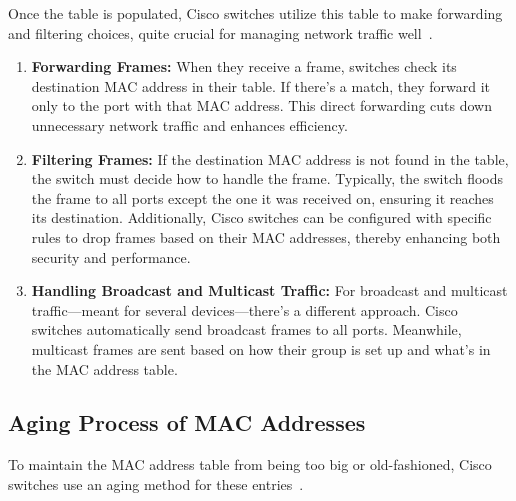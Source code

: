 \documentclass[11pt,a4paper]{article}
\begin{document}
Once the table is populated, Cisco switches utilize this table to make forwarding and filtering choices, quite crucial for managing network traffic well~\cite{Forwarding-and-Filtering}.
\begin{enumerate}
    
    \item \textbf{Forwarding Frames:} When they receive a frame, switches check its destination MAC address in their table. If there's a match, they forward it only to the port with that MAC address. This direct forwarding cuts down unnecessary network traffic and enhances efficiency.

    \item \textbf{Filtering Frames:} If the destination MAC address is not found in the table, the switch must decide how to handle the frame. Typically, the switch floods the frame to all ports except the one it was received on, ensuring it reaches its destination. Additionally, Cisco switches can be configured with specific rules to drop frames based on their MAC addresses, thereby enhancing both security and performance.

    \item \textbf{Handling Broadcast and Multicast Traffic:} For broadcast and multicast traffic—meant for several devices—there's a different approach. Cisco switches automatically send broadcast frames to all ports. Meanwhile, multicast frames are sent based on how their group is set up and what’s in the MAC address table.

\end{enumerate}


\subsection*{Aging Process of MAC Addresses}

To maintain the MAC address table from being too big or old-fashioned, Cisco switches use an aging method for these entries~\cite{Aging-Process}.
\end{document}
